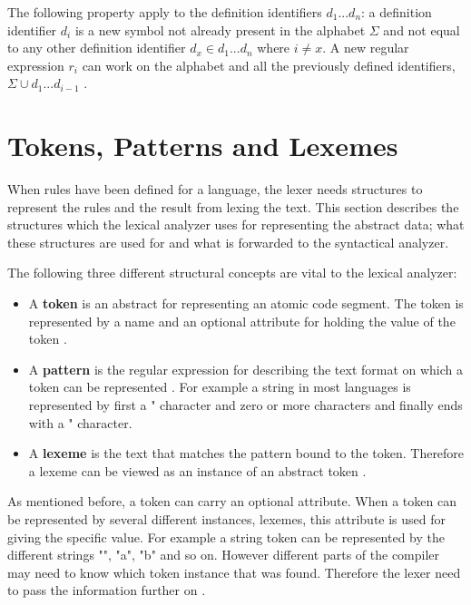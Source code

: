 The following property apply to the definition identifiers $d_1 ... d_n$: a
definition identifier $d_i$ is a new symbol not already present in the alphabet
$\Sigma$ and not equal to any other definition identifier
$d_x \in {d_1 ... d_n}$ where $i \neq x$. A new regular expression $r_i$ can work
on the alphabet and all the previously defined identifiers,
$\Sigma \cup {d_1 ... d_{i-1}}$ \cite{Aho2006}.


\section{Tokens, Patterns and Lexemes}
When rules have been defined for a language, the lexer needs structures to
represent the rules and the result from lexing the text.
This section describes the structures which the lexical analyzer uses
for representing the abstract data; what these structures are used for and what is
forwarded to the syntactical analyzer.

The following three different structural concepts are vital to the lexical
analyzer:
\begin{itemize}
  \item A \textbf{token} is an abstract for representing an atomic code
  segment. The token is represented by a name and an optional attribute for
  holding the value of the token \cite{Aho2006}.
  \item A \textbf{pattern} is the regular expression for describing the
  text format on which a token can be represented \cite{Aho2006}. For example a
  string in most languages is represented by first a " character and zero or 
  more characters and finally ends with a " character.
  \item A \textbf{lexeme} is the text that matches the pattern bound to 
  the token. Therefore a lexeme can be viewed as an instance of an abstract 
  token \cite{Aho2006}.
\end{itemize}
As mentioned before, a token can carry an optional attribute. When a token can
be represented by several different instances, lexemes, this attribute is used
for giving the specific value. For example a string token can be represented by
the different strings "", "a", "b" and so on. However different parts of the
compiler may need to know which token instance that was found.
Therefore the lexer need to pass the information further on \cite{Aho2006}.

